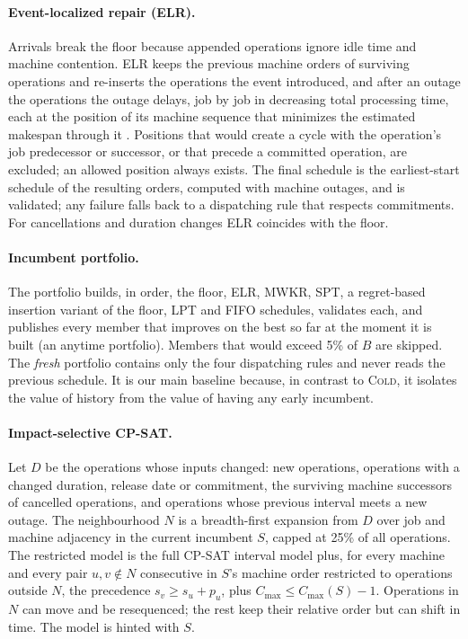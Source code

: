 \documentclass[letterpaper]{article} %
\newcommand{\mcold}{\textsc{Cold}}
\newcommand{\melr}{\textsc{ELR}}
\begin{document}
\paragraph{Event-localized repair (\melr).} Arrivals break the floor because appended operations ignore idle time and machine contention. \melr{} keeps the previous machine orders of surviving operations and re-inserts the operations the event introduced, and after an outage the operations the outage delays, job by job in decreasing total processing time, each at the position of its machine sequence that minimizes the estimated makespan through it \citep{werner1995}. Positions that would create a cycle with the operation's job predecessor or successor, or that precede a committed operation, are excluded; an allowed position always exists. The final schedule is the earliest-start schedule of the resulting orders, computed with machine outages, and is validated; any failure falls back to a dispatching rule that respects commitments. For cancellations and duration changes \melr{} coincides with the floor.

\paragraph{Incumbent portfolio.} The portfolio builds, in order, the floor, \melr, MWKR, SPT, a regret-based insertion variant of the floor, LPT and FIFO schedules, validates each, and publishes every member that improves on the best so far at the moment it is built (an anytime portfolio). Members that would exceed 5\% of $B$ are skipped. The \emph{fresh} portfolio contains only the four dispatching rules and never reads the previous schedule. It is our main baseline because, in contrast to \mcold{}, it isolates the value of history from the value of having any early incumbent.

\paragraph{Impact-selective CP-SAT.} Let $D$ be the operations whose inputs changed: new operations, operations with a changed duration, release date or commitment, the surviving machine successors of cancelled operations, and operations whose previous interval meets a new outage. The neighbourhood $N$ is a breadth-first expansion from $D$ over job and machine adjacency in the current incumbent $S$, capped at 25\% of all operations. The restricted model is the full CP-SAT interval model plus, for every machine and every pair $u,v\notin N$ consecutive in $S$'s machine order restricted to operations outside $N$, the precedence $s_v \ge s_u + p_u$, plus $C_{\max}\le C_{\max}(S)-1$. Operations in $N$ can move and be resequenced; the rest keep their relative order but can shift in time. The model is hinted with $S$.
\end{document}
